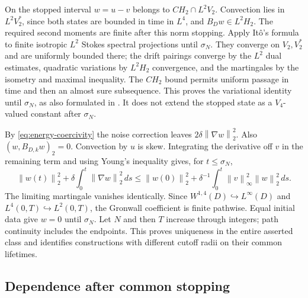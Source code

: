 \documentclass[11pt]{article}
\numberwithin{equation}{section}
\theoremstyle{remark}
\newcommand{\norm}[1]{\left\lVert#1\right\rVert}
\begin{document}
On the stopped interval $w=u-v$ belongs to $CH_2\cap L^2V_2$.
Convection lies in $L^2V_2^*$, since both states are bounded in
time in $L^4$, and $B_Dw\in L^2H_2$. The required second moments
are finite after this norm stopping. Apply It\^o's
formula to finite isotropic $L^2$ Stokes spectral projections until
$\sigma_N$. They converge on $V_2,V_2^*$ and are uniformly bounded
there; the drift pairings converge by the $L^2$ dual estimates,
quadratic variations by $L^2H_2$ convergence, and the martingales
by the isometry and maximal inequality. The $CH_2$ bound permits
uniform passage in time and then an almost sure subsequence.
This proves the variational identity until $\sigma_N$, as also
formulated in \cite[Lemma A.5]{AV}. It does not extend the stopped
state as a $V_4$-valued constant after $\sigma_N$.

By \eqref{eq:energy-coercivity} the noise correction leaves
$2\delta\norm{\nabla w}_2^2$. Also $(w,B_{D,k}w)_2=0$.
Convection by $u$ is skew. Integrating the derivative off $v$ in
the remaining term and using Young's inequality gives, for
$t\leq\sigma_N$,
\begin{equation}\label{eq:difference-energy}
 \norm{w(t)}_2^2+\delta\int_0^t\norm{\nabla w}_2^2\,ds
 \leq\norm{w(0)}_2^2+
 \delta^{-1}\int_0^t\norm{v}_\infty^2\norm{w}_2^2\,ds.
\end{equation}
The limiting martingale vanishes identically. Since
$W^{1,4}(D)\hookrightarrow L^\infty(D)$ and $L^4(0,T)\hookrightarrow L^2(0,T)$,
the Gronwall coefficient is finite pathwise. Equal initial data
give $w=0$ until $\sigma_N$. Let $N$ and then $T$ increase through
integers; path continuity includes the endpoints. This proves
uniqueness in the entire asserted class and identifies constructions
with different cutoff radii on their common lifetimes.

\subsection{Dependence after common stopping}\label{sec:dependence}
\end{document}
